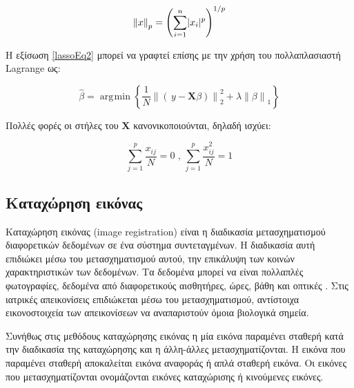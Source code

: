 \documentclass[a4paper,12pt]{article}
\DeclareMathOperator*{\argmin}{\arg\!\min}
\DeclarePairedDelimiter\abs{\lvert}{\rvert}
\newcommand\norm[1]{\left\lVert#1\right\rVert}
\begin{document}
\begin{equation*}
    \norm{x}_p=\left( \sum_{i=1}^{n} \abs{x_i}^p\right)^{1/p}
\end{equation*}

Η εξίσωση \eqref{lassoEq2} μπορεί να γραφτεί επίσης με την χρήση του
πολλαπλασιαστή Lagrange ως:

\begin{equation}\label{lassoEq3}
    \hat{\beta} = 
    \argmin{\left\{\frac{1}{N} \norm{\left(\,y - \bm{X} \beta\right)}_2^2 +
    \lambda \norm{\beta}_1 \right\}} 
\end{equation}

Πολλές φορές οι στήλες του $\bm{X}$ κανονικοποιούνται, δηλαδή ισχύει:

\begin{equation*}
    \sum_{j=1}^{p} {\frac{x_{ij}}{N}} = 0
    \text{ , }
    \sum_{j=1}^{p} {\frac{x_{ij}^2}{N}} = 1
\end{equation*}

\subsection{Καταχώρηση εικόνας} \label{registration:1}

Καταχώρηση εικόνας (image registration) είναι η διαδικασία μετασχηματισμού
διαφορετικών δεδομένων σε ένα σύστημα συντεταγμένων. Η διαδικασία αυτή επιδιώκει
μέσω του μετασχηματισμού αυτού, την επικάλυψη των κοινών χαρακτηριστικών των
δεδομένων. Τα δεδομένα μπορεί να είναι πολλαπλές φωτογραφίες, δεδομένα από
διαφορετικούς αισθητήρες, ώρες, βάθη και οπτικές \cite{Registration:1}. Στις
ιατρικές απεικονίσεις επιδιώκεται μέσω του μετασχηματισμού, αντίστοιχα
εικονοστοιχεία των απεικονίσεων να αναπαριστούν όμοια βιολογικά σημεία.

Συνήθως στις μεθόδους καταχώρησης εικόνας η μία εικόνα παραμένει σταθερή κατά
την διαδικασία της καταχώρησης και η άλλη-άλλες μετασχηματίζονται. Η εικόνα που
παραμένει σταθερή αποκαλείται εικόνα αναφοράς ή απλά σταθερή εικόνα. Οι εικόνες
που μετασχηματίζονται ονομάζονται εικόνες καταχώρισης ή κινούμενες εικόνες.
\end{document}
